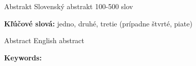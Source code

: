 \documentclass[12pt, oneside]{book}
\begin{document}

\newpage 
\thispagestyle{empty}

\huge{Abstrakt}
\normalsize
\newline
Slovenský abstrakt 100-500 slov

{\bf Kľúčové slová:} jedno, druhé, tretie (prípadne štvrté, piate)


\newpage 
\thispagestyle{empty}

\huge{Abstract}
\normalsize
\newline
English abstract

{\bf Keywords:} 


%
%



\newpage 

\tableofcontents



\newpage 

\listoffigures


\mainmatter


 











\newpage	

\backmatter
\end{document}
